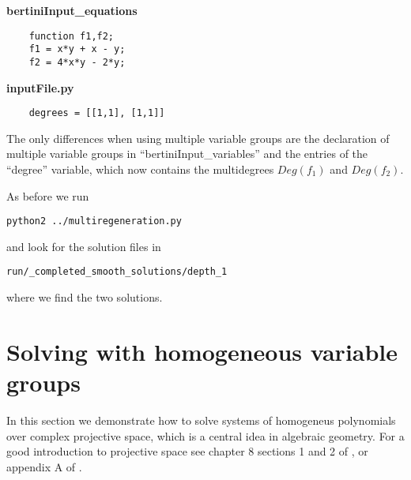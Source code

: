 \documentclass[12pt]{article}
\theoremstyle{definition}
\begin{document}
\noindent \textbf{bertiniInput\_equations}
\begin{leftbar}
\vspace{-10pt} 
\begin{verbatim}
    function f1,f2;
    f1 = x*y + x - y;
    f2 = 4*x*y - 2*y;
\end{verbatim}\vspace{-10pt} 
\end{leftbar}


\noindent \textbf{inputFile.py}
\begin{leftbar}
\vspace{-10pt} 
\begin{verbatim}
    degrees = [[1,1], [1,1]]
\end{verbatim}\vspace{-10pt} 
\end{leftbar}

The only differences when using multiple variable groups are the 
declaration of multiple variable groups in ``bertiniInput\_variables'' 
and the entries of the ``degree'' variable, which now contains the 
multidegrees $Deg(f_1)$ and $Deg(f_2)$.

\noindent As before we run
\begin{leftbar}
\vspace{-10pt} 
\begin{verbatim}
python2 ../multiregeneration.py
\end{verbatim}\vspace{-10pt} 
\end{leftbar}
\noindent and look for the solution files in 
\begin{leftbar}
\vspace{-10pt} 
\begin{verbatim}
run/_completed_smooth_solutions/depth_1
\end{verbatim}\vspace{-10pt} 
\end{leftbar}
\noindent where we find the two solutions.

\section{Solving with homogeneous variable groups}
In this section we demonstrate how to solve systems of homogeneus 
polynomials over complex projective space, which is a central idea in 
algebraic geometry. For a good introduction to 
projective space see chapter 8 sections 1 and 2 of \cite{clo}, or 
appendix A of \cite{st}.
\end{document}
